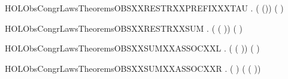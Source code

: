 \newcommand{\HOLObsCongrLawsTheoremsOBSXXRESTRXXPREFIXXXLABEL}{\UseVerbatim{HOLObsCongrLawsTheoremsOBSXXRESTRXXPREFIXXXLABEL}}
\begin{SaveVerbatim}{HOLObsCongrLawsTheoremsOBSXXRESTRXXPREFIXXXTAU}
\HOLTokenTurnstile{} \HOLSymConst{\HOLTokenForall{}} .  (\HOLConst{\ensuremath{\nu}}  (\HOLConst{\ensuremath{\tau}})) (\HOLConst{\ensuremath{\tau}}\HOLConst{\ensuremath{\nu}}  )
\end{SaveVerbatim}
\newcommand{\HOLObsCongrLawsTheoremsOBSXXRESTRXXPREFIXXXTAU}{\UseVerbatim{HOLObsCongrLawsTheoremsOBSXXRESTRXXPREFIXXXTAU}}
\begin{SaveVerbatim}{HOLObsCongrLawsTheoremsOBSXXRESTRXXSUM}
\HOLTokenTurnstile{} \HOLSymConst{\HOLTokenForall{}}  .  (\HOLConst{\ensuremath{\nu}}  ( \HOLSymConst{\ensuremath{+}} )) (\HOLConst{\ensuremath{\nu}}   \HOLSymConst{\ensuremath{+}} \HOLConst{\ensuremath{\nu}}  )
\end{SaveVerbatim}
\newcommand{\HOLObsCongrLawsTheoremsOBSXXRESTRXXSUM}{\UseVerbatim{HOLObsCongrLawsTheoremsOBSXXRESTRXXSUM}}
\begin{SaveVerbatim}{HOLObsCongrLawsTheoremsOBSXXSUMXXASSOCXXL}
\HOLTokenTurnstile{} \HOLSymConst{\HOLTokenForall{}}  .  ( \HOLSymConst{\ensuremath{+}} ( \HOLSymConst{\ensuremath{+}} )) ( \HOLSymConst{\ensuremath{+}}  \HOLSymConst{\ensuremath{+}} )
\end{SaveVerbatim}
\newcommand{\HOLObsCongrLawsTheoremsOBSXXSUMXXASSOCXXL}{\UseVerbatim{HOLObsCongrLawsTheoremsOBSXXSUMXXASSOCXXL}}
\begin{SaveVerbatim}{HOLObsCongrLawsTheoremsOBSXXSUMXXASSOCXXR}
\HOLTokenTurnstile{} \HOLSymConst{\HOLTokenForall{}}  .  ( \HOLSymConst{\ensuremath{+}}  \HOLSymConst{\ensuremath{+}} ) ( \HOLSymConst{\ensuremath{+}} ( \HOLSymConst{\ensuremath{+}} ))
\end{SaveVerbatim}
